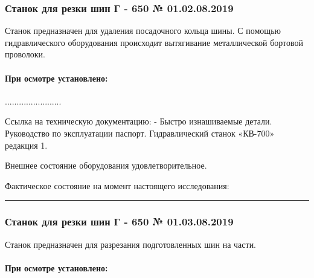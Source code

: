 \subsubsection{Станок для резки шин Г - 650 № 01.02.08.2019}

Станок предназначен для удаления посадочного кольца шины.
С помощью гидравлического оборудования происходит вытягивание металлической бортовой проволоки.

\vspace{10mm}



\paragraph{При  осмотре установлено:}

........................



Ссылка на техническую документацию:
- Быстро изнашиваемые детали. Руководство по эксплуатации паспорт.
Гидравлический станок «КВ-700» редакция 1.

Внешнее состояние оборудования удовлетворительное.

Фактическое состояние на момент настоящего исследования:

\rule{145mm}{0.1 mm}

\subsubsection{Станок для резки шин Г - 650 № 01.03.08.2019}

Станок предназначен для разрезания подготовленных шин на
 части.

\vspace{10mm}




\paragraph{При  осмотре установлено:}

